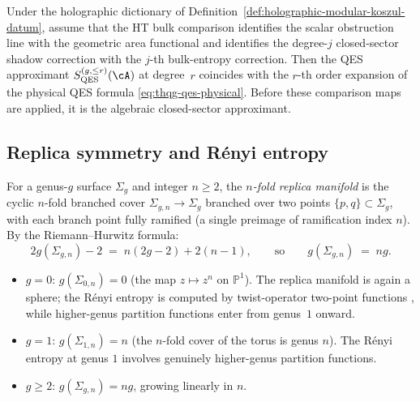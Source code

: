 \begin{conjecture}
\ClaimStatusConjectured
\label{conj:thqg-qes-identification}
Under the holographic dictionary of
Definition~\textup{\ref{def:holographic-modular-koszul-datum}},
assume that the HT bulk comparison identifies the scalar obstruction
line with the geometric area functional and identifies the
degree-$j$ closed-sector shadow correction with the $j$-th
bulk-entropy correction.  Then the QES approximant
$S_{\mathrm{QES}}^{(g,\le r)}(\cA)$ at degree~$r$ coincides with the
$r$-th order expansion of the physical QES formula
\eqref{eq:thqg-qes-physical}.  Before these comparison maps are
applied, it is the algebraic closed-sector approximant.
\end{conjecture}

%
%

\subsection{Replica symmetry and R\'enyi entropy}
\label{subsec:thqg-entanglement-replica}

\begin{construction}
\label{constr:thqg-replica-manifold}
For a genus-$g$ surface $\Sigma_g$ and integer $n \ge 2$,
the \emph{$n$-fold replica manifold} is the cyclic $n$-fold
branched cover
$\Sigma_{g,n} \to \Sigma_g$
branched over two points $\{p, q\} \subset \Sigma_g$,
with each branch point fully ramified
\textup{(}a single preimage of ramification index $n$\textup{)}.
By the Riemann--Hurwitz formula:
\begin{equation}\label{eq:thqg-replica-genus}
2g(\Sigma_{g,n}) - 2
\;=\; n(2g - 2) + 2(n-1),
\qquad\text{so}\qquad
g(\Sigma_{g,n}) \;=\; ng.
\end{equation}
\begin{itemize}
\item $g = 0$: $g(\Sigma_{0,n}) = 0$
 \textup{(}the map $z \mapsto z^n$ on $\mathbb{P}^1$\textup{)}.
 The replica manifold is again a sphere; the R\'enyi entropy
 is computed by twist-operator two-point functions
 \cite{Calabrese-Cardy04}, while higher-genus partition functions
 enter from genus~$1$ onward.

\item $g = 1$: $g(\Sigma_{1,n}) = n$
 \textup{(}the $n$-fold cover of the torus is genus $n$\textup{)}.
 The R\'enyi entropy at genus $1$ involves genuinely higher-genus
 partition functions.

\item $g \ge 2$: $g(\Sigma_{g,n}) = ng$, growing linearly in $n$.
\end{itemize}
\end{construction}

